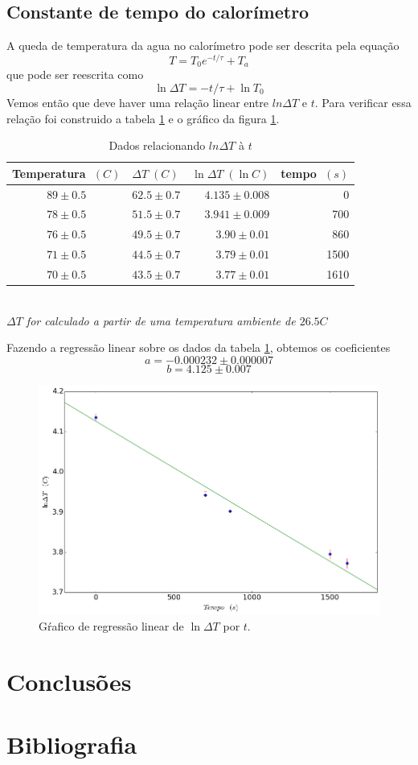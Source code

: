 \documentclass[12pt,a4paper]{article}
\begin{document}
\subsection{Constante de tempo do calorímetro}
A queda de temperatura da agua no calorímetro pode ser descrita pela equação
$$ T = T_0 e^{-t/\tau} + T_a $$
que pode ser reescrita como
$$ \ln \Delta T = -t/\tau + \ln T_0 $$
Vemos então que deve haver uma relação linear entre $ln \Delta T$ e $ t $. Para verificar essa relação foi construido a tabela \ref{table:tempo} e o gráfico da figura \ref{fig:tempo}. \\
\begin{table}[!htbp]
\centering
\def\arraystretch{1.5}
\caption{Dados relacionando $ln \Delta T$ à $t$}
\label{table:tempo}
\begin{tabular}{|c|l|r|r|}
\hline
Temperatura $\; (C)$ & $\Delta T \; (C)$ & $\ln \Delta T \; (\ln C)$ & tempo $\; (s)$ \\
\hline
 $89 \pm 0.5$ & $ 62.5 \pm  0.7 $ & $ 4.135 \pm 0.008 $    &    0 \\
 \hline
 $78 \pm 0.5$ & $ 51.5 \pm  0.7 $ & $ 3.941 \pm 0.009 $ &  700 \\
 \hline
 $76 \pm 0.5 $& $ 49.5 \pm  0.7 $ & $ 3.90 \pm 0.01 $ &  860 \\
 \hline
 $71 \pm 0.5$ & $ 44.5 \pm  0.7 $ & $ 3.79 \pm 0.01 $ & 1500 \\
 \hline
 $70 \pm 0.5$& $ 43.5 \pm  0.7 $ & $ 3.77 \pm 0.01 $ & 1610 \\
\hline
\end{tabular}\\
\emph{$\Delta T$ for calculado a partir de uma temperatura ambiente de $26.5 C$}

\end{table}
Fazendo a regressão linear sobre os dados da tabela \ref{table:tempo}, obtemos os coeficientes 
$$ a = -0.000232 \pm 0.000007 $$
$$ b = 4.125 \pm 0.007 $$

\begin{figure}[!htbp]
\includegraphics[scale=0.55]{tempo.png}
\caption{Gŕafico de regressão linear de $ \ln \Delta T$ por $t$.}
\label{fig:tempo}
\end{figure}


\section{Conclusões}


\section{Bibliografia}
\end{document}
